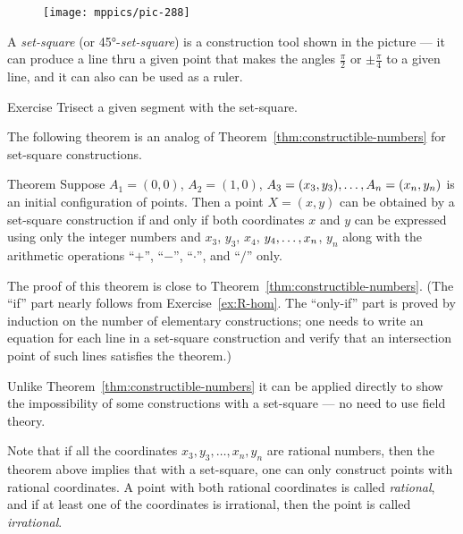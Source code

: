 {

\begin{wrapfigure}[5]{r}{26mm}
\vskip-12mm
\centering
\texttt{[image: mppics/pic-288]}
\end{wrapfigure}

A \emph{set-square} (or 45°-{}\emph{set-square}) is a construction tool shown in the picture ---
it can produce a line thru a given point
that makes the angles
$\tfrac\pi2$ or $\pm\tfrac\pi4$ 
to a given line, and it can also can be used as a ruler.

}

\begin{thm}{Exercise}\label{ex:trisect-set-square}
Trisect a given segment with the set-square.
\end{thm}

The following theorem is an analog of Theorem~\ref{thm:constructible-numbers} for set-square constructions.

\begin{thm}{Theorem}\label{thm:set-square-constructible-numbers}
Suppose $A_1=(0,0)$, $A_2=(1,0)$, $A_3=(x_3,y_3),\dots,A_n=(x_n,y_n)$ is 
an initial configuration of points.
Then a point $X=(x,y)$ can be obtained by a set-square construction
if and only if both coordinates $x$ and $y$ can be expressed using only the integer numbers and $x_3$, $y_3$, $x_4$, $y_4,\dots,x_n$, $y_n$ along with the arithmetic operations ``$+$'', ``$-$'', ``$\cdot$'', and ``$/$'' only. 
\end{thm}

The proof of this theorem is close to Theorem~\ref{thm:constructible-numbers}.
(The ``if'' part nearly follows from Exercise~\ref{ex:R-hom}.
The ``only-if'' part is proved by induction on the number of elementary constructions; one needs to write an equation for each line in a set-square construction and verify that an intersection point of such lines satisfies the theorem.)

Unlike Theorem~\ref{thm:constructible-numbers} it can be applied directly to show the impossibility of some constructions with a set-square --- no need to use field theory.

Note that if all the coordinates $x_3,y_3,\dots,x_n,y_n$ are rational numbers, then the theorem above implies that with a set-square, one can only construct points with rational coordinates.
A point with both rational coordinates is called \emph{rational},
and if at least one of the coordinates is irrational, then the point is called \emph{irrational}.

